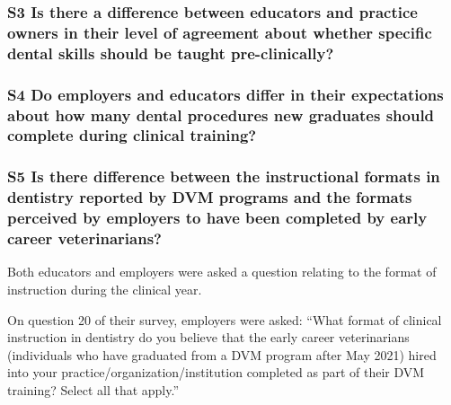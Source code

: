 \documentclass[
  11pt,
  letterpaper,
  DIV=11,
  numbers=noendperiod]{scrartcl}
\numberwithin{figure}{section}
\begin{document}
\hypertarget{s3-is-there-a-difference-between-educators-and-practice-owners-in-their-level-of-agreement-about-whether-specific-dental-skills-should-be-taught-pre-clinically}{%
\subsubsection{S3 Is there a difference between educators and practice
owners in their level of agreement about whether specific dental skills
should be taught
pre-clinically?}\label{s3-is-there-a-difference-between-educators-and-practice-owners-in-their-level-of-agreement-about-whether-specific-dental-skills-should-be-taught-pre-clinically}}

\hypertarget{s4-do-employers-and-educators-differ-in-their-expectations-about-how-many-dental-procedures-new-graduates-should-complete-during-clinical-training}{%
\subsubsection{S4 Do employers and educators differ in their
expectations about how many dental procedures new graduates should
complete during clinical
training?}\label{s4-do-employers-and-educators-differ-in-their-expectations-about-how-many-dental-procedures-new-graduates-should-complete-during-clinical-training}}

\hypertarget{s5-is-there-difference-between-the-instructional-formats-in-dentistry-reported-by-dvm-programs-and-the-formats-perceived-by-employers-to-have-been-completed-by-early-career-veterinarians}{%
\subsubsection{S5 Is there difference between the instructional formats
in dentistry reported by DVM programs and the formats perceived by
employers to have been completed by early career
veterinarians?}\label{s5-is-there-difference-between-the-instructional-formats-in-dentistry-reported-by-dvm-programs-and-the-formats-perceived-by-employers-to-have-been-completed-by-early-career-veterinarians}}

Both educators and employers were asked a question relating to the
format of instruction during the clinical year.

On question 20 of their survey, employers were asked: ``What format of
clinical instruction in dentistry do you believe that the early career
veterinarians (individuals who have graduated from a DVM program after
May 2021) hired into your practice/organization/institution completed as
part of their DVM training? Select all that apply.''
\end{document}
